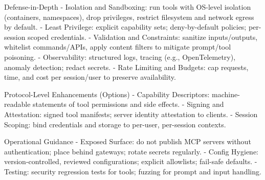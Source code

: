 Defense-in-Depth
- Isolation and Sandboxing: run tools with OS-level isolation (containers, namespaces), drop privileges, restrict filesystem and network egress by default.
- Least Privilege: explicit capability sets; deny-by-default policies; per-session scoped credentials.
- Validation and Constraints: sanitize inputs/outputs, whitelist commands/APIs, apply content filters to mitigate prompt/tool poisoning.
- Observability: structured logs, tracing (e.g., OpenTelemetry), anomaly detection; redact secrets.
- Rate Limiting and Budgets: cap requests, time, and cost per session/user to preserve availability.

Protocol-Level Enhancements (Options)
- Capability Descriptors: machine-readable statements of tool permissions and side effects.
- Signing and Attestation: signed tool manifests; server identity attestation to clients.
- Session Scoping: bind credentials and storage to per-user, per-session contexts.

Operational Guidance
- Exposed Surface: do not publish MCP servers without authentication; place behind gateways; rotate secrets regularly.
- Config Hygiene: version-controlled, reviewed configurations; explicit allowlists; fail-safe defaults.
- Testing: security regression tests for tools; fuzzing for prompt and input handling.


